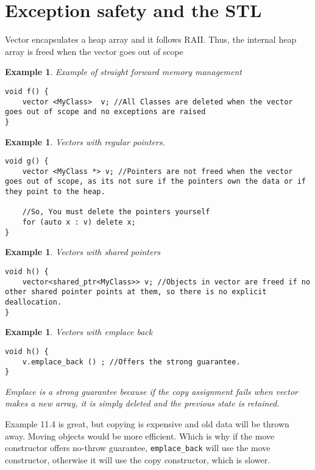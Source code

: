 \documentclass{article}
\newtheorem{ex}[theorem]{Example}
\begin{document}
\section{Exception safety and the STL}
Vector encapsulates a heap array and it follows RAII. Thus, the internal heap array is freed when the vector goes out of scope 

\begin{ex} Example of straight forward memory management
\begin{lstlisting}
void f() {
	vector <MyClass>  v; //All Classes are deleted when the vector goes out of scope and no exceptions are raised 
}
\end{lstlisting} 
\end{ex}

\begin{ex} Vectors with regular pointers. 
\begin{lstlisting}
void g() {
	vector <MyClass *> v; //Pointers are not freed when the vector goes out of scope, as its not sure if the pointers own the data or if they point to the heap.
	
	//So, You must delete the pointers yourself
	for (auto x : v) delete x; 
}
\end{lstlisting}
\end{ex}

\begin{ex} Vectors with shared pointers 
\begin{lstlisting}
void h() {
	vector<shared_ptr<MyClass>> v; //Objects in vector are freed if no other shared pointer points at them, so there is no explicit deallocation. 
}
\end{lstlisting}
\end{ex}
 

\begin{ex} Vectors with emplace back 
\begin{lstlisting}
void h() {
	v.emplace_back () ; //Offers the strong guarantee. 
}
\end{lstlisting}
Emplace is a strong guarantee because if the copy assignment fails when vector makes a new array, it is simply deleted and the previous state is retained. 
\end{ex}

Example 11.4 is great, but copying is expensive and old data will be thrown away. Moving objects would be more efficient. Which is why if the move constructor offers no-throw guarantee, \verb|emplace_back| will use the move constructor, otherwise it will use the copy constructor, which is slower.
\end{document}

